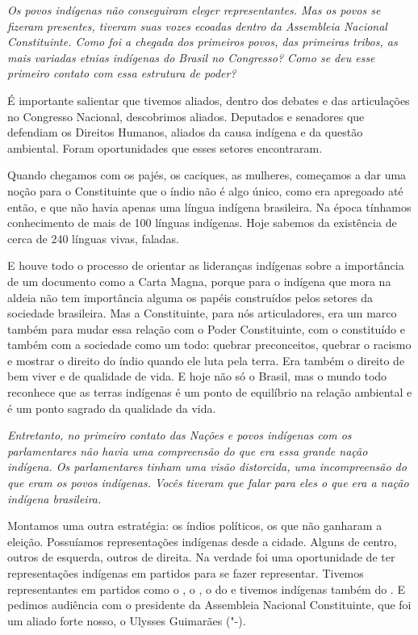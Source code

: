 \medskip

\noindent\emph{Os povos indígenas não conseguiram eleger representantes. Mas os
povos se fizeram presentes, tiveram suas vozes ecoadas dentro da
Assembleia Nacional Constituinte. Como foi a chegada dos primeiros
povos, das primeiras tribos, as mais variadas etnias indígenas do Brasil
no Congresso? Como se deu esse primeiro contato com essa estrutura de
poder?}

É importante salientar que tivemos aliados, dentro dos
debates e das articulações no Congresso Nacional, descobrimos aliados.
Deputados e senadores que defendiam os Direitos Humanos, aliados da
causa indígena e da questão ambiental. Foram oportunidades que esses
setores encontraram.

Quando chegamos com os pajés, os caciques, as mulheres, começamos a dar
uma noção para o Constituinte que o índio não é algo único, como era
apregoado até então, e que não havia apenas uma língua indígena
brasileira. Na época tínhamos conhecimento de mais de 100 línguas
indígenas. Hoje sabemos da existência de cerca de 240 línguas vivas,
faladas.

E houve todo o processo de orientar as lideranças indígenas sobre a
importância de um documento como a Carta Magna, porque para o indígena
que mora na aldeia não tem importância alguma os papéis construídos
pelos setores da sociedade brasileira. Mas a Constituinte, para nós
articuladores, era um marco também para mudar essa relação com o Poder
Constituinte, com o constituído e também com a sociedade como um todo:
quebrar preconceitos, quebrar o racismo e mostrar o direito do índio
quando ele luta pela terra. Era também o direito de bem viver e de
qualidade de vida. E hoje não só o Brasil, mas o mundo todo reconhece
que as terras indígenas é um ponto de equilíbrio na relação ambiental e
é um ponto sagrado da qualidade da vida.

\medskip

\noindent\emph{Entretanto, no primeiro contato das Nações e povos indígenas com
os parlamentares não havia uma compreensão do que era essa grande nação
indígena. Os parlamentares tinham uma visão distorcida, uma
incompreensão do que eram os povos indígenas. Vocês tiveram que falar
para eles o que era a nação indígena brasileira.}

Montamos uma outra estratégia: os índios políticos, os
que não ganharam a eleição. Possuíamos representações indígenas desde a
cidade. Alguns de centro, outros de esquerda, outros de direita. Na
verdade foi uma oportunidade de ter representações indígenas em partidos
para se fazer representar. Tivemos representantes em partidos como o ,
o , o do e tivemos indígenas também do . E pedimos audiência
com o presidente da Assembleia Nacional Constituinte, que foi um aliado
forte nosso, o Ulysses Guimarães ("-).

